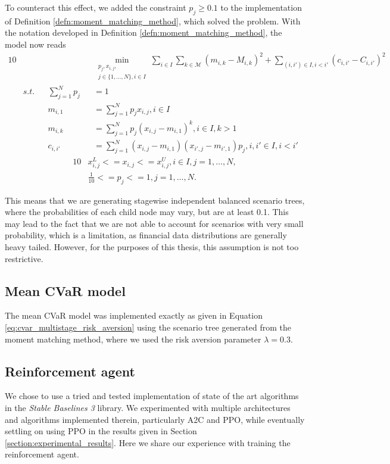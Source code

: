 To counteract this effect, we added the constraint $p_j \geq 0.1$ to the implementation of Definition \ref{defn:moment_matching_method}, which solved the problem. With the notation developed in Definition \ref{defn:moment_matching_method}, the model now reads
\begin{alignat}{10}
& && && \underset{\substack{p_j, x_{i,j}, \\ j \in \{1,...,N\}, i \in I}}{\min} \sum_{i\in I} \sum_{k\in \mathcal{M}} \left(m_{i,k} - M_{i,k}\right)^2 + \sum_{(i, i') \in I, i < i'}(c_{i,i'}-C_{i,i'})^2 \nonumber \\
& s.t. && \sum_{j=1}^N p_j&&=1 \nonumber \\
& && m_{i,1}&&=\sum_{j=1}^N p_jx_{i,j}, i \in I \nonumber \\
& && m_{i,k}&&=\sum_{j=1}^N p_j(x_{i,j}-m_{i,1})^k, i \in I, k>1 \nonumber \\
& && c_{i,i'}&&=\sum_{j=1}^N(x_{i,j}-m_{i,1})(x_{i',j}-m_{i',1})p_j, i,i' \in I, i<i' \nonumber
\end{alignat}
\vspace{-0.5cm}
\begin{alignat}{10}
& x_{i,j}^L<=x_{i,j}<=x_{i,j}^U, i \in I, j=1,\dots,N, \nonumber \\
& \frac{1}{10} <= p_j <= 1, j=1,\dots,N. \nonumber
\end{alignat}

This means that we are generating stagewise independent balanced scenario trees, where the probabilities of each child node may vary, but are at least 0.1. This may lead to the fact that we are not able to account for scenarios with very small probability, which is a limitation, as financial data distributions are generally heavy tailed. However, for the purposes of this thesis, this assumption is not too restrictive.


\subsection{Mean CVaR model}
The mean CVaR model was implemented exactly as given in Equation \ref{eq:cvar_multistage_risk_aversion} using the scenario tree generated from the moment matching method, where we used the risk aversion parameter $\lambda=0.3.$ 

\subsection{Reinforcement agent}
We chose to use a tried and tested implementation of state of the art algorithms in the \textit{Stable Baselines 3} \cite{stable_baselines3} library. We experimented with multiple architectures and algorithms implemented therein, particularly A2C and PPO, while eventually settling on using PPO in the results given in Section \ref{section:experimental_results}. Here we share our experience with training the reinforcement agent.

